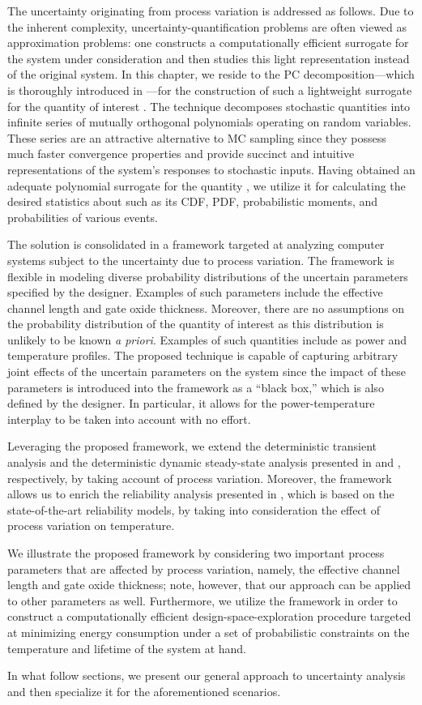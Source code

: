 The uncertainty originating from process variation is addressed as follows. Due
to the inherent complexity, uncertainty-quantification problems are often viewed
as approximation problems: one constructs a computationally efficient surrogate
for the system under consideration and then studies this light representation
instead of the original system. In this chapter, we reside to the \ac{PC}
decomposition---which is thoroughly introduced in ---for
the construction of such a lightweight surrogate for the quantity of interest
\g. The technique decomposes stochastic quantities into infinite series of
mutually orthogonal polynomials operating on random variables. These series are
an attractive alternative to \ac{MC} sampling since they possess much faster
convergence properties and provide succinct and intuitive representations of the
system's responses to stochastic inputs. Having obtained an adequate polynomial
surrogate for the quantity \g, we utilize it for calculating the desired
statistics about \g such as its \ac{CDF}, \ac{PDF}, probabilistic moments, and
probabilities of various events.

The solution is consolidated in a framework targeted at analyzing computer
systems subject to the uncertainty due to process variation. The framework is
flexible in modeling diverse probability distributions of the uncertain
parameters specified by the designer. Examples of such parameters include the
effective channel length and gate oxide thickness. Moreover, there are no
assumptions on the probability distribution of the quantity of interest as this
distribution is unlikely to be known \emph{a priori}. Examples of such
quantities include as power and temperature profiles. The proposed technique is
capable of capturing arbitrary joint effects of the uncertain parameters on the
system since the impact of these parameters is introduced into the framework as
a ``black box,'' which is also defined by the designer. In particular, it allows
for the power-temperature interplay to be taken into account with no effort.

Leveraging the proposed framework, we extend the deterministic transient
analysis and the deterministic dynamic steady-state analysis presented in
 and ,
respectively, by taking account of process variation. Moreover, the framework
allows us to enrich the reliability analysis presented in
, which is based on the state-of-the-art reliability
models, by taking into consideration the effect of process variation on
temperature.

We illustrate the proposed framework by considering two important process
parameters that are affected by process variation, namely, the effective channel
length and gate oxide thickness; note, however, that our approach can be applied
to other parameters as well. Furthermore, we utilize the framework in order to
construct a computationally efficient design-space-exploration procedure
targeted at minimizing energy consumption under a set of probabilistic
constraints on the temperature and lifetime of the system at hand.

In what follow sections, we present our general approach to uncertainty analysis
and then specialize it for the aforementioned scenarios.
